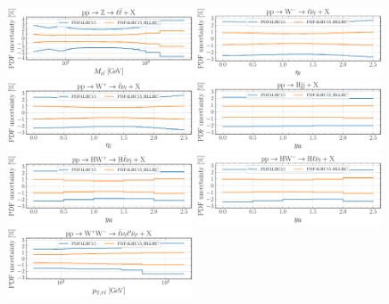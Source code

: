 \begin{figure}[htbp]
	\centering
	\includegraphics[width=0.49\textwidth]{plots/LHCpheno/NNPDF_DY_14TEV_40_PHENO-global-HLLHC.pdf}
	\includegraphics[width=0.49\textwidth]{plots/LHCpheno/NNPDF_WM_14TEV_40_PHENO-global-HLLHC.pdf}
	\includegraphics[width=0.49\textwidth]{plots/LHCpheno/NNPDF_WP_14TEV_40_PHENO-global-HLLHC.pdf}
	\includegraphics[width=0.49\textwidth]{plots/LHCpheno/NNPDF_HVBF_14TEV_40_PHENO-global-HLLHC.pdf}
	\includegraphics[width=0.49\textwidth]{plots/LHCpheno/NNPDF_HWP_14TEV_40_PHENO-global-HLLHC.pdf}
	\includegraphics[width=0.49\textwidth]{plots/LHCpheno/NNPDF_HWM_14TEV_40_PHENO-global-HLLHC.pdf}
	\includegraphics[width=0.49\textwidth]{plots/LHCpheno/NNPDF_WPWM_14TEV_40_PHENO-global-HLLHC.pdf}

\end{figure}
